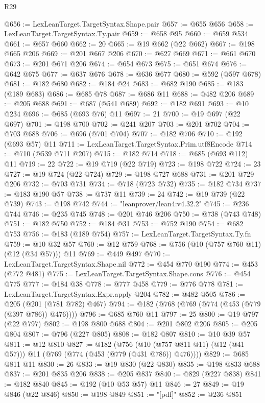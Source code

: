 \begin{lexlean}{R29}
\begin{coremodule}
@656 := LexLeanTarget.TargetSyntax.Shape.pair
@657 := @655 @656
@658 := LexLeanTarget.TargetSyntax.Ty.pair
@659 := @658 @95
@660 := @659 @534
@661 := @657 @660
@662 := 20
@665 := @19 @662 (@22 @662)
@667 := @198 @665 @206
@669 := @201 @667 @206
@670 := @627 @669
@671 := @661 @670
@673 := @201 @671 @206
@674 := @654 @673
@675 := @651 @674
@676 := @642 @675
@677 := @637 @676
@678 := @636 @677
@680 := @592 (@597 @678)
@681 := @182 @680
@682 := @184 @24
@683 := @682 @190
@685 := @183 (@189 @683)
@686 := @685 @78
@687 := @686 @11
@688 := @482 @206
@689 := @205 @688
@691 := @687 (@541 @689)
@692 := @182 @691
@693 := @10 @234
@696 := @685 (@693 @76) @11
@697 := 21
@700 := @19 @697 (@22 @697)
@701 := @198 @700
@702 := @241 @207
@703 := @201 @702
@704 := @703 @688
@706 := @696 (@701 @704)
@707 := @182 @706
@710 := @192 (@693 @57) @11
@711 := LexLeanTarget.TargetSyntax.Prim.utf8Encode
@714 := @710 (@539 @711 @207)
@715 := @182 @714
@718 := @685 (@693 @112) @11
@719 := 22
@722 := @19 @719 (@22 @719)
@723 := @198 @722
@724 := 23
@727 := @19 @724 (@22 @724)
@729 := @198 @727 @688
@731 := @201 @729 @206
@732 := @703 @731
@734 := @718 (@723 @732)
@735 := @182 @734
@737 := @183 @190 @57
@738 := @737 @11
@739 := 24
@742 := @19 @739 (@22 @739)
@743 := @198 @742
@744 := "leanprover/lean4:v4.32.2"
@745 := @236 @744
@746 := @235 @745
@748 := @201 @746 @206
@750 := @738 (@743 @748)
@751 := @182 @750
@752 := @184 @31
@753 := @752 @190
@754 := @682 @753
@756 := @183 (@189 @754)
@757 := LexLeanTarget.TargetSyntax.Ty.fn
@759 := @10 @32 @57
@760 := @12 @759
@768 := @756 (@10 (@757 @760 @11) (@12 (@34 @57))) @11
@769 := @449 @497
@770 := LexLeanTarget.TargetSyntax.Shape.nil
@772 := @454 @770 @190
@774 := @453 (@772 @481)
@775 := LexLeanTarget.TargetSyntax.Shape.cons
@776 := @454 @775
@777 := @184 @38
@778 := @777 @458
@779 := @776 @778
@781 := LexLeanTarget.TargetSyntax.Expr.apply @204
@782 := @482 @505
@786 := @205 (@201 (@781 @782) @467)
@794 := @182 (@768 (@769 (@774 (@453 (@779 (@397 @786)) @476))))
@796 := @685 @760 @11
@797 := 25
@800 := @19 @797 (@22 @797)
@802 := @198 @800 @688
@804 := @201 @802 @206
@805 := @205 @804
@807 := @796 (@227 @805)
@808 := @182 @807
@810 := @10 @39 @57
@811 := @12 @810
@827 := @182
    (@756 (@10 (@757 @811 @11) (@12 (@41 @57))) @11 (@769 (@774 (@453 (@779 (@431 @786)) @476))))
@829 := @685 @811 @11
@830 := 26
@833 := @19 @830 (@22 @830)
@835 := @198 @833 @688
@837 := @201 @835 @206
@838 := @205 @837
@840 := @829 (@227 @838)
@841 := @182 @840
@845 := @192 (@10 @53 @57) @11
@846 := 27
@849 := @19 @846 (@22 @846)
@850 := @198 @849
@851 := "[pdf]"
@852 := @236 @851

\end{coremodule}
\end{lexlean}
